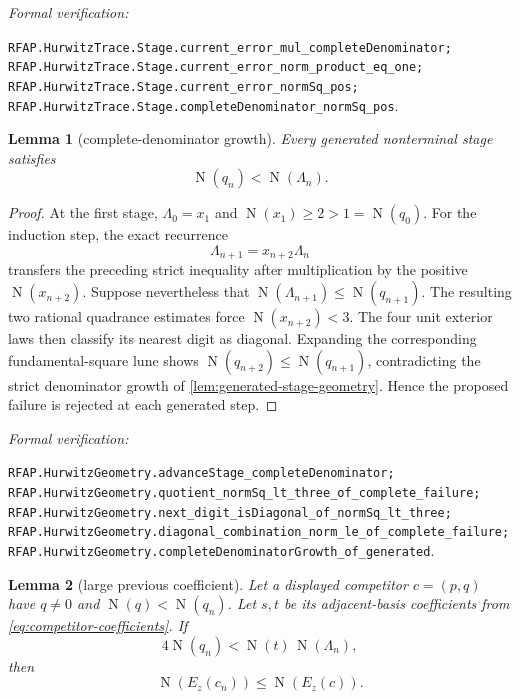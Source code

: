 \documentclass[11pt]{article}
\newtheorem{lemma}[lemma]{Lemma}
\newcommand{\Norm}[1]{\operatorname{N}\!\left(#1\right)}
\newcommand{\leanref}[1]{\par\smallskip\noindent
  \emph{Formal verification:}\par\nobreak
  {\raggedright\nolinkurl{#1}.\par}}
\begin{document}
\leanref{RFAP.HurwitzTrace.Stage.current_error_mul_completeDenominator;
RFAP.HurwitzTrace.Stage.current_error_norm_product_eq_one;
RFAP.HurwitzTrace.Stage.current_error_normSq_pos;
RFAP.HurwitzTrace.Stage.completeDenominator_normSq_pos}

\begin{lemma}[complete-denominator growth]
\label{lem:complete-denominator-growth}
Every generated nonterminal stage satisfies
\begin{equation}
\label{eq:complete-denominator-growth}
                         \Norm{q_n}<\Norm{\Lambda_n}.
\end{equation}
\end{lemma}

\begin{proof}
At the first stage, $\Lambda_0=x_1$ and
$\Norm{x_1}\ge2>1=\Norm{q_0}$.  For the induction step, the exact recurrence
\[
                  \Lambda_{n+1}=x_{n+2}\Lambda_n
\]
transfers the preceding strict inequality after multiplication by the
positive $\Norm{x_{n+2}}$.  Suppose nevertheless that
$\Norm{\Lambda_{n+1}}\le\Norm{q_{n+1}}$.  The resulting two rational
quadrance estimates force $\Norm{x_{n+2}}<3$.  The four unit exterior laws
then classify its nearest digit as diagonal.  Expanding the corresponding
fundamental-square lune shows
$\Norm{q_{n+2}}\le\Norm{q_{n+1}}$, contradicting the strict denominator
growth of \cref{lem:generated-stage-geometry}.  Hence the proposed failure is
rejected at each generated step.
\end{proof}

\leanref{RFAP.HurwitzGeometry.advanceStage_completeDenominator;
RFAP.HurwitzGeometry.quotient_normSq_lt_three_of_complete_failure;
RFAP.HurwitzGeometry.next_digit_isDiagonal_of_normSq_lt_three;
RFAP.HurwitzGeometry.diagonal_combination_norm_le_of_complete_failure;
RFAP.HurwitzGeometry.completeDenominatorGrowth_of_generated}

\begin{lemma}[large previous coefficient]
\label{lem:large-previous-coefficient}
Let a displayed competitor $c=(p,q)$ have $q\ne0$ and
$\Norm q<\Norm{q_n}$.  Let $s,t$ be its adjacent-basis coefficients from
\eqref{eq:competitor-coefficients}.  If
\begin{equation}
\label{eq:large-previous-coefficient}
       4\Norm{q_n}<\Norm t\,\Norm{\Lambda_n},
\end{equation}
then
\[
                         \Norm{E_z(c_n)}\le\Norm{E_z(c)}.
\]
\end{lemma}
\end{document}
